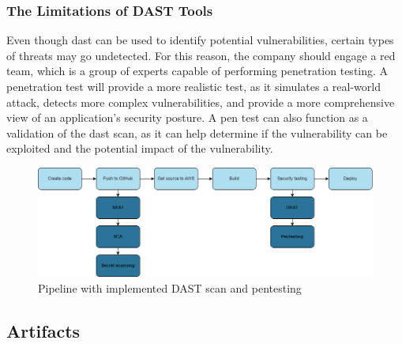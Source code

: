 \subsubsection{The Limitations of DAST Tools}
Even though \acrshort{dast} can be used to identify potential vulnerabilities, certain types of threats may go undetected. For this reason, the company should engage a red team, which is a group of experts capable of performing penetration testing. A penetration test will provide a more realistic test, as it simulates a real-world attack, detects more complex vulnerabilities, and provide a more comprehensive view of an application's security posture. A pen test can also function as a validation of the \acrshort{dast} scan, as it can help determine if the vulnerability can be exploited and the potential impact of the vulnerability. \cite{dastpentesting}

\vspace{2mm}
\begin{figure}[H]
    \centering
    \includegraphics[width=0.8\columnwidth]{Images/pipeline5.png}
    \caption{Pipeline with implemented DAST scan and pentesting}
    \label{fig: Pipeline with implemented DAST scan and pentesting}
\end{figure}

\subsection{Artifacts}



